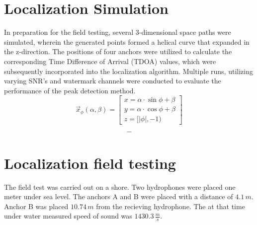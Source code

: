 \section{Localization Simulation}
In preparation for the field testing, several 3-dimensional space paths were simulated, wherein the generated points formed a helical curve that expanded in the z-direction. The positions of four anchors were utilized to calculate the corresponding Time Difference of Arrival (TDOA) values, which were subsequently incorporated into the localization algorithm. Multiple runs, utilizing varying SNR's and watermark channels were conducted to evaluate the performance of the peak detection method.\\
\begin{equation}
	\vec{x}_{\phi}(\alpha,\beta)
	=\left[
	\begin{array}{c}
		x=\alpha\cdot\sin{\phi}+\beta\\
		y=\alpha\cdot\cos{\phi}+\beta\\
		z=[|\phi|,-1)
	\end{array}
	\right]
\end{equation}

\begin{equation}
	-
\end{equation}

\section{Localization field testing}

The field test was carried out on a shore. Two hydrophones were placed one meter under sea level. The anchors A and B were placed with a distance of $4.1\,m$. Anchor B was placed $10.74\,m$ from the recieving hydrophone. The at that time under water measured speed of sound was $1430.3\,\frac{m}{s}$.